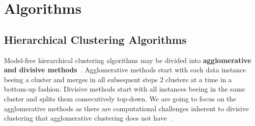 \chapter{Algorithms}\label{\positionnumber}

\section{Hierarchical Clustering Algorithms}\label{\positionnumber}
Model-free hierarchical clustering algorithms may be divided into \textbf{agglomerative and divisive methods}~\cite{han2011data}. Agglomerative methods start with each data instance beeing a cluster and merges in all subsequent steps 2 clusters at a time in a bottom-up fashion. Divisive methods start with all instances beeing in the same cluster and splits them consecutively top-down. We are going to focus on the agglomerative methods as there are computational challenges inherent to divisive clustering that agglomerative clustering does not have~\cite{han2011data}. \\

